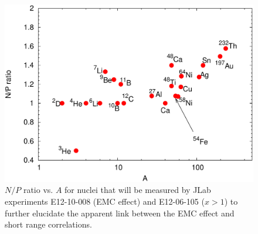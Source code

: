 \begin{figure}[tbp]
  \includegraphics[width=\columnwidth]{plots/np_ratios_2017-crop.pdf}
  \caption{$N/P$ ratio vs. $A$ for nuclei that will be measured by JLab experiments E12-10-008 (EMC effect)
    and E12-06-105 ($x>1$) to further elucidate the apparent link between the EMC effect and short range
    correlations.}
  \label{fig:np_ratios}
\end{figure}
